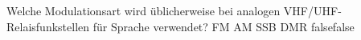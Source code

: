     {Welche Modulationsart wird üblicherweise bei analogen VHF/UHF-Relaisfunkstellen für Sprache verwendet?}
    {FM}
    {AM}
    {SSB}
    {DMR}
    {false}{false}